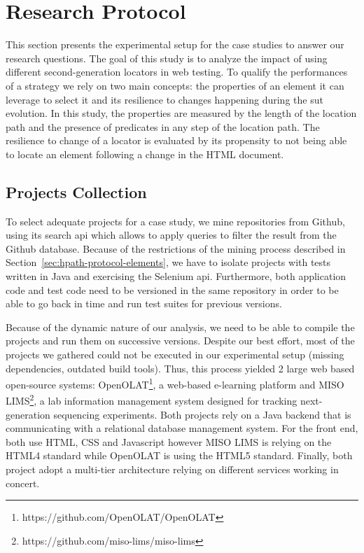 \section{Research Protocol}
\label{sec:hpath-protocol}

This section presents the experimental setup for the case studies to answer our research questions. The goal of this study is to analyze the impact of using different second-generation locators in web testing. To qualify the performances of a strategy we rely on two main concepts: the properties of an element it can leverage to select it and its resilience to changes happening during the \gls{sut} evolution. In this study, the properties are measured by the length of the location path and the presence of predicates in any step of the location path. The resilience to change of a locator is evaluated by its propensity to not being able to locate an element following a change in the HTML document.

\subsection{Projects Collection}
\label{sec:hpath-protocol-projects}

To select adequate projects for a case study, we mine repositories from Github, using its search \gls{api} which allows to apply queries to filter the result from the Github database. Because of the restrictions of the mining process described in Section~\ref{sec:hpath-protocol-elements}, we have to isolate projects with tests written in Java and exercising the Selenium \gls{api}. Furthermore, both application code and test code need to be versioned in the same repository in order to be able to go back in time and run test suites for previous versions.

Because of the dynamic nature of our analysis, we need to be able to compile the projects and run them on successive versions. Despite our best effort, most of the projects we gathered could not be executed in our experimental setup (missing dependencies, outdated build tools). Thus, this process yielded 2 large web based open-source systems: OpenOLAT\footnote{https://github.com/OpenOLAT/OpenOLAT}, a web-based e-learning platform and MISO LIMS\footnote{https://github.com/miso-lims/miso-lims}, a lab information management system designed for tracking next-generation sequencing experiments. Both projects rely on a Java backend that is communicating with a relational database management system. For the front end, both use HTML, CSS and Javascript however MISO LIMS is relying on the HTML4 standard while OpenOLAT is using the HTML5 standard. Finally, both project adopt a multi-tier architecture relying on different services working in concert.

